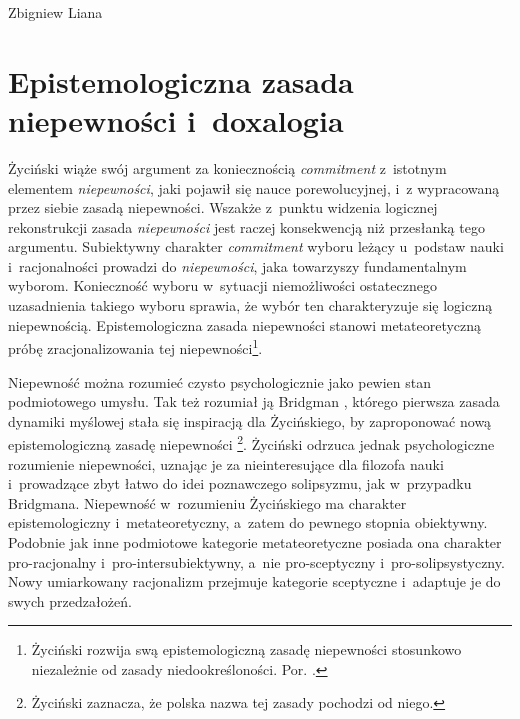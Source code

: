 \begin{artplenv}{Zbigniew Liana}
\section{Epistemologiczna zasada niepewności i~doxalogia}
Życiński wiąże swój argument za koniecznością \textit{commitment} z~istotnym elementem \textit{niepewności}, jaki pojawił się nauce porewolucyjnej, i~z wypracowaną przez siebie zasadą niepewności. Wszakże z~punktu widzenia logicznej rekonstrukcji zasada \textit{niepewności} jest raczej konsekwencją niż przesłanką tego argumentu. Subiektywny charakter \textit{commitment} wyboru leżący u~podstaw nauki i~racjonalności prowadzi do \textit{niepewności}, jaka towarzyszy fundamentalnym wyborom. Konieczność wyboru w~sytuacji niemożliwości ostatecznego uzasadnienia takiego wyboru sprawia, że wybór ten charakteryzuje się logiczną niepewnością. Epistemologiczna zasada niepewności stanowi metateoretyczną próbę zracjonalizowania tej niepewności\footnote{Życiński rozwija swą epistemologiczną zasadę niepewności stosunkowo niezależnie od zasady niedookreśloności. Por.
\parencites[][s.~145]{zycinski_structure_1988}[][s.~256]{zycinski_struktura_2013_liana}.%
}.

Niepewność można rozumieć czysto psychologicznie jako pewien stan podmiotowego umysłu. Tak też rozumiał ją Bridgman
\parencite*[][]{bridgman_reflections_1950}, %
 którego pierwsza zasada dynamiki myślowej stała się inspiracją dla Życińskiego, by zaproponować nową epistemologiczną zasadę niepewności 
\parencites[][s.~158–161]{zycinski_teizm_1985}[][s.~137–139]{zycinski_structure_1988}[][s.~243–247]{zycinski_struktura_2013_liana}%
\footnote{Życiński 
\parencite*[][s.~159, przypis 78]{zycinski_teizm_1985} %
 zaznacza, że polska nazwa tej zasady pochodzi od niego.}. Życiński odrzuca jednak psychologiczne rozumienie niepewności, uznając je za nieinteresujące dla filozofa nauki i~prowadzące zbyt łatwo do idei poznawczego solipsyzmu, jak w~przypadku Bridgmana. Niepewność w~rozumieniu Życińskiego ma charakter epistemologiczny i~metateoretyczny, a~zatem do pewnego stopnia obiektywny. Podobnie jak inne podmiotowe kategorie metateoretyczne posiada ona charakter pro-racjonalny i~pro-intersubiektywny, a~nie pro-sceptyczny i~pro-solipsystyczny. Nowy umiarkowany racjonalizm przejmuje kategorie sceptyczne i~adaptuje je do swych przedzałożeń.


\end{artplenv}
